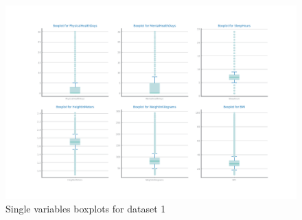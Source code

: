 \documentclass[10pt]{extarticle}
\begin{document}
\begin{figure}[H]
\centering\includegraphics[scale=0.60]{images/dataset1/data_profiling/CovidPos_single_boxplots.png}
\caption{Single variables boxplots for dataset 1}
\end{figure}
\end{document}
